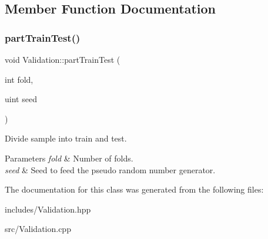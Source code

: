 \subsection{Member Function Documentation}
\mbox{\label{class_validation_ad50f5974699c4d13098371fdf56f8342}} 
\subsubsection{\texorpdfstring{part\+Train\+Test()}{partTrainTest()}}
{\footnotesize\ttfamily void Validation\+::part\+Train\+Test (\begin{DoxyParamCaption}\item[{int}]{fold,  }\item[{uint}]{seed }\end{DoxyParamCaption})}



Divide sample into train and test. 


\begin{DoxyParams}{Parameters}
{\em fold} & Number of folds. \\
\hline
{\em seed} & Seed to feed the pseudo random number generator. \\
\hline
\end{DoxyParams}


The documentation for this class was generated from the following files\+:\begin{DoxyCompactItemize}
\item 
includes/Validation.\+hpp\item 
src/Validation.\+cpp\end{DoxyCompactItemize}
